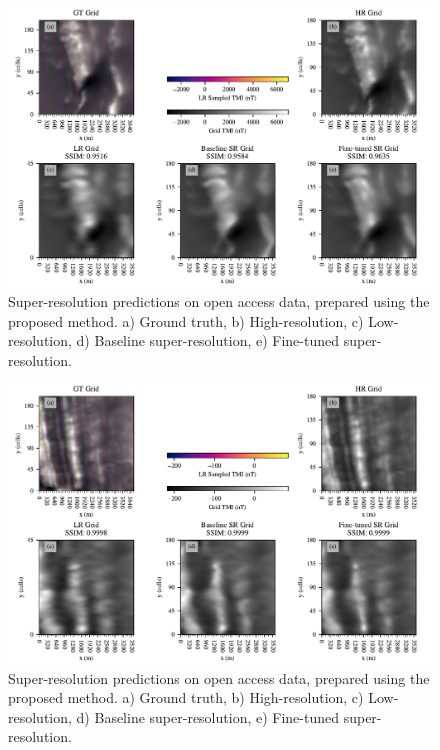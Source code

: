 \begin{landscape}
    \begin{figure}[hbtp]
        \centering
        \includegraphics[width=1\linewidth]{fig/p2/srcomp_14.pdf}
        \caption[Super-resolution geophysics grid results III]{Super-resolution predictions on open access data, prepared using the proposed method.
            a) Ground truth, b) High-resolution, c) Low-resolution, d) Baseline super-resolution, e) Fine-tuned super-resolution.
        }
        \label{fig:srdata14}
    \end{figure}
\end{landscape}

\begin{landscape}
    \begin{figure}[hbtp]
        \centering
        \includegraphics[width=1\linewidth]{fig/p2/srcomp_18.pdf}
        \caption[Super-resolution geophysics grid results IV]{Super-resolution predictions on open access data, prepared using the proposed method.
            a) Ground truth, b) High-resolution, c) Low-resolution, d) Baseline super-resolution, e) Fine-tuned super-resolution.
        }
        \label{fig:srdata18}
    \end{figure}
\end{landscape}


